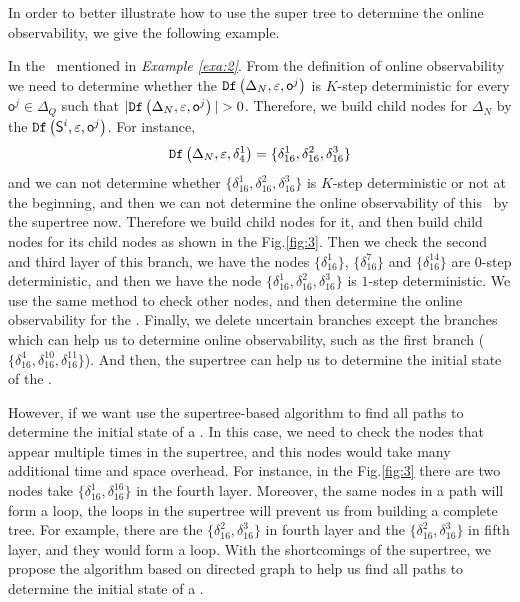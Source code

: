 In order to better illustrate how to use the super tree to determine the online observability, we give the following example.
  
\begin{example}
In the \BCN\ mentioned in {\em Example \ref{exa:2}}. From the definition of online observability we need to determine whether the ${\tt Df}\left(\Delta_N,\varepsilon,\mathsf{o}^j\right)$ is $K$-step deterministic for every  $\mathsf{o}^j\in \Delta_Q$ such that $|\Ded\left(\Delta_N,\varepsilon, \mathsf{o}^j\right)|> 0$. Therefore, we build child nodes for $\Delta_N$ by the ${\tt Df}\left(\mathsf{S}^i,\varepsilon, \mathsf{o}^j\right)$. For instance, \[{\tt Df}\left(\Delta_N,\varepsilon,\delta_{4}^1\right)=\{\delta_{16}^1,\delta_{16}^2,\delta_{16}^3\}\] and we can not determine whether $\{\delta_{16}^1,\delta_{16}^2,\delta_{16}^3\}$ is $K$-step deterministic or not at the beginning, and then we can not determine the online observability of this \BCN\ by the supertree now. Therefore we build child nodes for it, and then build child nodes for its child nodes as shown in the Fig.\ref{fig:3}. Then we check the second and third layer of this branch, we have the nodes $\{\delta_{16}^1\}$, $\{\delta_{16}^7\}$ and $\{\delta_{16}^{14}\}$ are $0$-step deterministic, and then we have the node $\{\delta_{16}^1,\delta_{16}^2,\delta_{16}^3\}$ is $1$-step deterministic. We use the same method to check other nodes, and then determine the online observability for the \BCN. Finally, we delete uncertain branches except the branches which can help us to determine online observability, such as the first branch ($\{\delta_{16}^{4},\delta_{16}^{10},\delta_{16}^{11}\}$). And then, the supertree can help us to determine the initial state of the \BCN.%
\label{exa:11}
\end{example}   

However, if we want use the supertree-based algorithm to find all paths to determine the initial state of a \BCN. In this case, we need to check the nodes that appear multiple times in the supertree, and this nodes would take many additional time and space overhead. For instance, in the Fig.\ref{fig:3} there are two nodes take $\{\delta_{16}^1,\delta_{16}^{16}\}$ in the fourth layer. Moreover, the same nodes in a path will form a loop, the loops in the supertree will prevent us from building a complete tree. For example, there are the $\{\delta_{16}^2,\delta_{16}^3\}$ in fourth layer and the $\{\delta_{16}^2,\delta_{16}^3\}$ in fifth layer, and they would form a loop. With the shortcomings of the supertree, we propose the algorithm based on directed graph to help us find all paths to determine the initial state of a \BCN.
